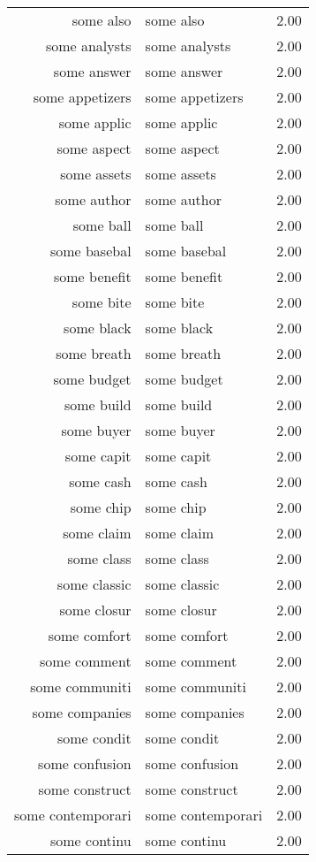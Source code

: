 \begin{table}[ht]
\begin{tabular}{rlr}
  some also & some also & 2.00 \\ 
  some analysts & some analysts & 2.00 \\ 
  some answer & some answer & 2.00 \\ 
  some appetizers & some appetizers & 2.00 \\ 
  some applic & some applic & 2.00 \\ 
  some aspect & some aspect & 2.00 \\ 
  some assets & some assets & 2.00 \\ 
  some author & some author & 2.00 \\ 
  some ball & some ball & 2.00 \\ 
  some basebal & some basebal & 2.00 \\ 
  some benefit & some benefit & 2.00 \\ 
  some bite & some bite & 2.00 \\ 
  some black & some black & 2.00 \\ 
  some breath & some breath & 2.00 \\ 
  some budget & some budget & 2.00 \\ 
  some build & some build & 2.00 \\ 
  some buyer & some buyer & 2.00 \\ 
  some capit & some capit & 2.00 \\ 
  some cash & some cash & 2.00 \\ 
  some chip & some chip & 2.00 \\ 
  some claim & some claim & 2.00 \\ 
  some class & some class & 2.00 \\ 
  some classic & some classic & 2.00 \\ 
  some closur & some closur & 2.00 \\ 
  some comfort & some comfort & 2.00 \\ 
  some comment & some comment & 2.00 \\ 
  some communiti & some communiti & 2.00 \\ 
  some companies & some companies & 2.00 \\ 
  some condit & some condit & 2.00 \\ 
  some confusion & some confusion & 2.00 \\ 
  some construct & some construct & 2.00 \\ 
  some contemporari & some contemporari & 2.00 \\ 
  some continu & some continu & 2.00 \\ 

\end{tabular}
\end{table}
